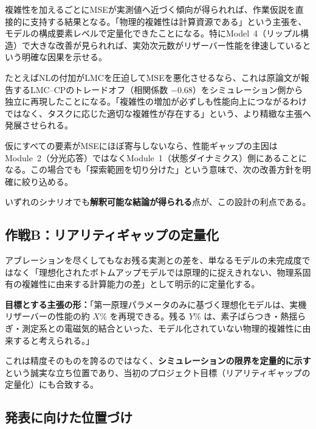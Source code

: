 \documentclass[11pt,a4paper]{ltjsarticle}
\begin{document}
\begin{description}[leftmargin=12mm,style=nextline]
\item[シナリオ1：単調な改善が観測される場合]
複雑性を加えるごとにMSEが実測値へ近づく傾向が得られれば、作業仮説を直接的に支持する結果となる。「物理的複雑性は計算資源である」という主張を、モデルの構成要素レベルで定量化できたことになる。特にModel~4（リップル構造）で大きな改善が見られれば、実効次元数がリザーバー性能を律速しているという明確な因果を示せる。

\item[シナリオ2：途中で飽和・悪化する場合]
たとえばNLの付加がLMCを圧迫してMSEを悪化させるなら、これは原論文が報告するLMC--CPのトレードオフ（相関係数 $-0.68$）をシミュレーション側から独立に再現したことになる。「複雑性の増加が必ずしも性能向上につながるわけではなく、タスクに応じた適切な複雑性が存在する」という、より精緻な主張へ発展させられる。

\item[シナリオ3：どの要素も効かない場合]
仮にすべての要素がMSEにほぼ寄与しないなら、性能ギャップの主因はModule~2（分光応答）ではなくModule~1（状態ダイナミクス）側にあることになる。この場合でも「探索範囲を切り分けた」という意味で、次の改善方針を明確に絞り込める。
\end{description}

いずれのシナリオでも\textbf{解釈可能な結論が得られる}点が、この設計の利点である。

\subsection{作戦B：リアリティギャップの定量化}

アブレーションを尽くしてもなお残る実測との差を、単なるモデルの未完成度ではなく「理想化されたボトムアップモデルでは原理的に捉えきれない、物理系固有の複雑性に由来する計算能力の差」として明示的に定量化する。

\begin{keybox}
\textbf{目標とする主張の形：}「第一原理パラメータのみに基づく理想化モデルは、実機リザーバーの性能の約 $X\%$ を再現できる。残る $Y\%$ は、素子ばらつき・熱揺らぎ・測定系との電磁気的結合といった、モデル化されていない物理的複雑性に由来すると考えられる。」
\end{keybox}

これは精度そのものを誇るのではなく、\textbf{シミュレーションの限界を定量的に示す}という誠実な立ち位置であり、当初のプロジェクト目標（リアリティギャップの定量化）にも合致する。

\subsection{発表に向けた位置づけ}
\end{document}
